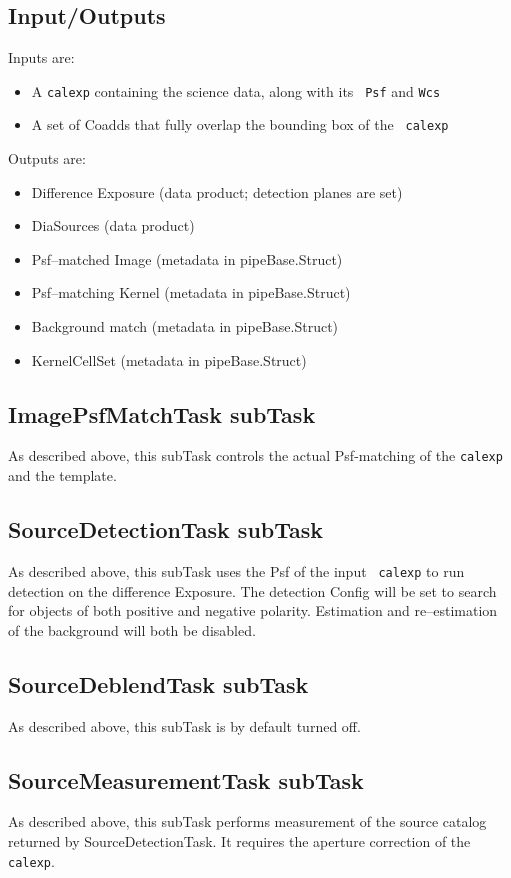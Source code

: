 \documentclass[12pt]{article}
\begin{document}
\subsection{Input/Outputs}

Inputs are:
\begin{itemize}
\item A {\tt calexp} containing the science data, along with its {\tt
  Psf} and {\tt Wcs}
\item A set of Coadds that fully overlap the bounding box of the {\tt
  calexp}
\end{itemize}

Outputs are:
\begin{itemize}
\item Difference Exposure (data product; detection planes are set)
\item DiaSources (data product)
\item Psf--matched Image (metadata in pipeBase.Struct)
\item Psf--matching Kernel (metadata in pipeBase.Struct)
\item Background match (metadata in pipeBase.Struct)
\item KernelCellSet (metadata in pipeBase.Struct)
\end{itemize}

\subsection{ImagePsfMatchTask subTask}
As described above, this subTask controls the actual Psf-matching of
the {\tt calexp} and the template.  

\subsection{SourceDetectionTask subTask}
As described above, this subTask uses the Psf of the input {\tt
  calexp} to run detection on the difference Exposure.  The detection
Config will be set to search for objects of both positive and negative
polarity.  Estimation and re--estimation of the background will both
be disabled.

\subsection{SourceDeblendTask subTask}
As described above, this subTask is by default turned off.

\subsection{SourceMeasurementTask subTask}
As described above, this subTask performs measurement of the source
catalog returned by SourceDetectionTask.  It requires the aperture
correction of the {\tt calexp}.
\end{document}
